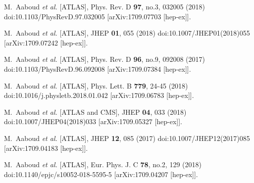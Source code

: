 \begin{thebibliography}{9}
M.~Aaboud \textit{et al.} [ATLAS],
Phys. Rev. D \textbf{97}, no.3, 032005 (2018)
doi:10.1103/PhysRevD.97.032005
[arXiv:1709.07703 [hep-ex]].

M.~Aaboud \textit{et al.} [ATLAS],
JHEP \textbf{01}, 055 (2018)
doi:10.1007/JHEP01(2018)055
[arXiv:1709.07242 [hep-ex]].

M.~Aaboud \textit{et al.} [ATLAS],
Phys. Rev. D \textbf{96}, no.9, 092008 (2017)
doi:10.1103/PhysRevD.96.092008
[arXiv:1709.07384 [hep-ex]].

M.~Aaboud \textit{et al.} [ATLAS],
Phys. Lett. B \textbf{779}, 24-45 (2018)
doi:10.1016/j.physletb.2018.01.042
[arXiv:1709.06783 [hep-ex]].

M.~Aaboud \textit{et al.} [ATLAS and CMS],
JHEP \textbf{04}, 033 (2018)
doi:10.1007/JHEP04(2018)033
[arXiv:1709.05327 [hep-ex]].

M.~Aaboud \textit{et al.} [ATLAS],
JHEP \textbf{12}, 085 (2017)
doi:10.1007/JHEP12(2017)085
[arXiv:1709.04183 [hep-ex]].

M.~Aaboud \textit{et al.} [ATLAS],
Eur. Phys. J. C \textbf{78}, no.2, 129 (2018)
doi:10.1140/epjc/s10052-018-5595-5
[arXiv:1709.04207 [hep-ex]].


\end{thebibliography}
